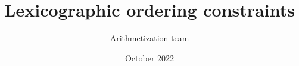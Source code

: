 \documentclass{article}
\title{Lexicographic ordering constraints}
\author{Arithmetization team}
\date{October 2022}
\begin{document}
\maketitle
\tableofcontents

\renewcommand{\arraystretch}{1.3}


\end{document}
